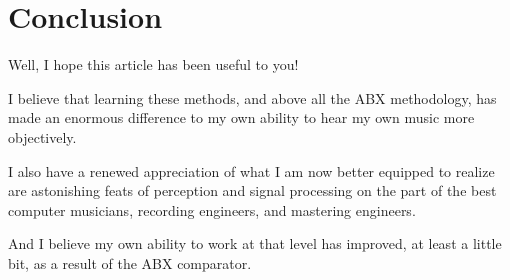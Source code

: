 \documentclass[english,11pt,letterpaper,onecolumn]{scrartcl}
\begin{document}
\section{Conclusion}

Well, I hope this article has been useful to you!

I believe that learning these methods, and above all the ABX methodology, has 
made an enormous difference to my own ability to hear my own music more 
objectively. 

I also have a renewed appreciation of what I am now better equipped to realize 
are astonishing feats of perception and signal processing on the part of the 
best computer musicians, recording engineers, and mastering engineers. 

And I believe my own ability to work at that level has improved, at least a 
little bit, as a result of the ABX comparator.

\printbibliography
\end{document}
